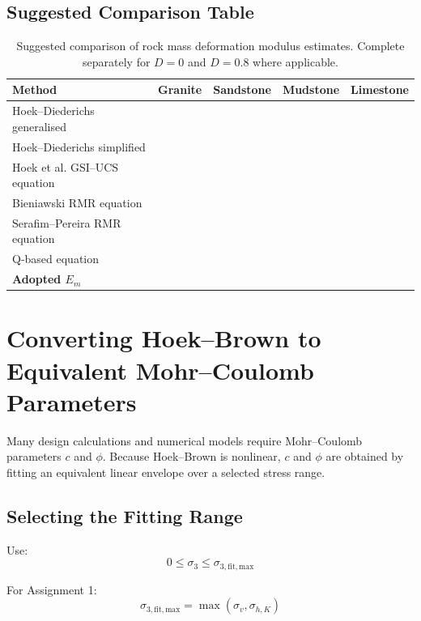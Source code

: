 \documentclass[a4paper,12pt]{article}
\begin{document}
\subsection{Suggested Comparison Table}

\begin{table}[H]
\centering
\small
\begin{tabularx}{\textwidth}{l c c c c}
\toprule
\textbf{Method} & \textbf{Granite} & \textbf{Sandstone} & \textbf{Mudstone} & \textbf{Limestone} \\
\midrule
Hoek--Diederichs generalised & & & & \\
Hoek--Diederichs simplified & & & & \\
Hoek et al. GSI--UCS equation & & & & \\
Bieniawski RMR equation & & & & \\
Serafim--Pereira RMR equation & & & & \\
Q-based equation & & & & \\
\midrule
\textbf{Adopted \(E_m\)} & & & & \\
\bottomrule
\end{tabularx}
\caption{Suggested comparison of rock mass deformation modulus estimates. Complete separately for \(D=0\) and \(D=0.8\) where applicable.}
\label{tab:modulus_comparison}
\end{table}
\section{Converting Hoek--Brown to Equivalent Mohr--Coulomb Parameters}

Many design calculations and numerical models require Mohr--Coulomb parameters
\(c\) and \(\phi\). Because Hoek--Brown is nonlinear, \(c\) and \(\phi\) are obtained by
fitting an equivalent linear envelope over a selected stress range.

\subsection{Selecting the Fitting Range}

Use:
\[
0 \leq \sigma_3 \leq \sigma_{3,\mathrm{fit,max}}
\]

For Assignment 1:
\[
\sigma_{3,\mathrm{fit,max}}=\max(\sigma_v,\sigma_{h,K})
\]
\end{document}
